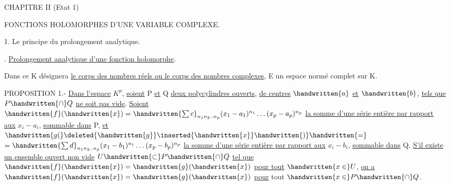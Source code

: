 
\begin{center}
CHAPITRE II (Etat 1)

FONCTIONS HOLOMORPHES D'UNE VARIABLE COMPLEXE.

\handwritten{\S}1. Le principe du prolongement analytique.
\end{center}

\uline{}. \uline{Prolongement analytique d'une fonction holomorphe}.

Dans ce \handwritten{\S}\unsure{,|;} K désignera \uline{le corps des nombres réels ou le corps des nombres complexes}, E un espace normé complet sur K.

PROPOSITION 1.- \uline{Dans l'espace} $K^p$, \uline{soient} P \uline{et} Q \uline{deux polycylindres ouverts}, \uline{de centres} $\handwritten{a}$ \uline{et} $\handwritten{b}$, \uline{tels que} $P\handwritten{\cap}Q$ \uline{ne soit pas vide}. \uline{Soient} $\handwritten{f}(\handwritten{x})=\handwritten{\sum c}_{n_1n_2..n_p}(x_1-a_1)^{n_1}\ldots(x_p-a_p)^{n_p}$ \uline{la somme d'une série entière par rapport aux} $x_i-a_i$, \uline{sommable dans} P, \uline{et} $\handwritten{g(}\deleted{\handwritten{g}}\inserted{\handwritten{x}}\handwritten{)}\handwritten{=}$ $=\handwritten{\sum d}_{n_1n_2..n_p}(x_1-b_1)^{n_1}\ldots(x_p-b_p)^{n_p}$ \uline{la somme d'une série entière par rapport aux} $x_i-b_i$, \uline{sommable dans} Q. \uline{S'il existe un ensemble ouvert non vide} $U\handwritten{\subset}P\handwritten{\cap}Q$ \uline{tel que} $\handwritten{f}(\handwritten{x})=\handwritten{g}(\handwritten{x})$ \uline{pour tout} $\handwritten{x\in}U$, \uline{on a} $\handwritten{f}(\handwritten{x})=\handwritten{g}(\handwritten{x})$ \uline{pour} tout $\handwritten{x\in}P\handwritten{\cap}Q$.


